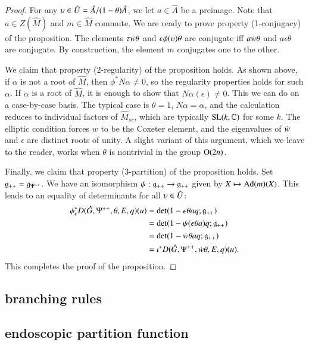\begin{proof}
For any $\upsilon\in \hat U = \hat A/(1-\theta)\hat A$, we let $a\in \hat A$ be a
preimage.  Note that $a\in Z(\hat M)$ and $m\in \hat M$ commute.  We
are ready to prove property (1-conjugacy) of the proposition.  The
elements $\tau\dot w\theta$ and $\epsilon\phi(\upsilon)\theta$ are conjugate
iff $a\dot w\theta$ and $a\epsilon \theta$ are conjugate.  By
construction, the element $m$ conjugates one to the other.

We claim that property (2-regularity) of the proposition holds.  As
shown above, if $\alpha$ is not a root of $\hat M$, then
$\phi^*N\alpha\ne 0$, so the regularity properties holds for such
$\alpha$.  If $\alpha$ is a root of $\hat M$, it is enough to show
that $N\alpha(\epsilon)\ne0$.  This we can do on a case-by-case basis.
The typical case is $\theta=1$, $N\alpha = \alpha$, and the
calculation reduces to individual factors of $\hat M_{sc}$, which are
typically ${\operatorname{SL}}(k,\mathbb{C})$ for some $k$. The elliptic condition forces
$w$ to be the Coxeter element, and the eigenvalues of $\dot w$ and
$\epsilon$ are distinct roots of unity.  A slight variant of this
argument, which we leave to the reader, works when $\theta$ is
nontrivial in the group ${\operatorname{O}}(2n)$.

Finally, we claim that property (3-partition) of the proposition
holds.  Set ${\mathfrak g}_{++}={\mathfrak g}_{\Psi^{++}}$.
We have an isomorphism $\psi:{\mathfrak g}_{++}\to {\mathfrak g}_{++}$ given by
$X\mapsto {\operatorname{Ad}}(m)(X)$.  This leads to an equality of determinants for
all $\upsilon\in \hat U$:
\begin{align*}
\phi^*_\epsilon D(\hat G,\Psi^{++},\theta,E,q) (u) &=
\det(1- \epsilon \theta a q;{\mathfrak g}_{++}) \\ &=
\det(1-\psi(\epsilon\theta a) q;{\mathfrak g}_{++}) \\ &=
\det(1-\dot w \theta a q;{\mathfrak g}_{++}) \\ &=
\iota^* D(\hat G,\Psi^{++},\dot w\theta,E,q)(u).
\end{align*}
This completes the proof of the proposition.
\end{proof}


\subsection{branching rules}\label{sec:branch}

\subsection{endoscopic partition function}


